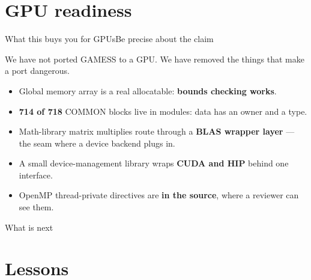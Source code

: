 \documentclass[aspectratio=169]{beamer}
\begin{document}
\section{GPU readiness}

\begin{frame}{What this buys you for GPUs}{Be precise about the claim}
  \begin{alertblock}{We have not ported GAMESS to a GPU.}
    We have removed the things that make a port dangerous.
  \end{alertblock}
  \small
  \begin{itemize}\setlength\itemsep{3pt}
    \item[\cookiecheck] Global memory array is a real allocatable: \textbf{bounds checking works}.
    \item[\cookiecheck] \textbf{714 of 718} COMMON blocks live in modules: data has an owner and a type.
    \item[\cookiecheck] Math-library matrix multiplies route through a \textbf{BLAS wrapper layer} --- the seam where a device backend plugs in.
    \item[\cookiecheck] A small device-management library wraps \textbf{CUDA and HIP} behind one interface.
    \item[\cookiecheck] OpenMP thread-private directives are \textbf{in the source}, where a reviewer can see them.
  \end{itemize}
\end{frame}

\begin{frame}{What is next}
  \centering
\end{frame}

\section{Lessons}
\end{document}
